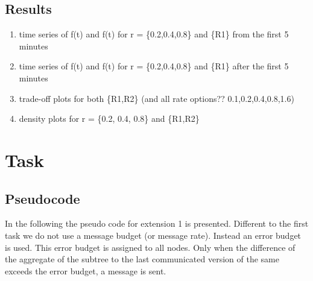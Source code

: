 \documentclass[a4paper, smallheadings,english]{scrartcl}
\begin{document}
\subsection{Results}
\begin{enumerate}
    \item time series of f(t) and f(t) for r = \{0.2,0.4,0.8\} and \{R1\} from the first 5 minutes
    \item time series of f(t) and f(t) for r = \{0.2,0.4,0.8\} and \{R1\} after the first 5 minutes
    \item trade-off plots for both \{R1,R2\} (and all rate options?? 0.1,0.2,0.4,0.8,1.6)
    \item density plots for r = \{0.2, 0.4, 0.8\} and \{R1,R2\}
\end{enumerate}

\section{Task}
\label{sec:task2}
\subsection{Pseudocode}
In the following the pseudo code for extension 1 is presented. Different to the first task we do not use a message budget (or message rate). Instead an error budget is used. This error budget is assigned to all nodes. Only when the difference of the aggregate of the subtree to the last communicated version of the same exceeds the error budget, a message is sent.
\end{document}
